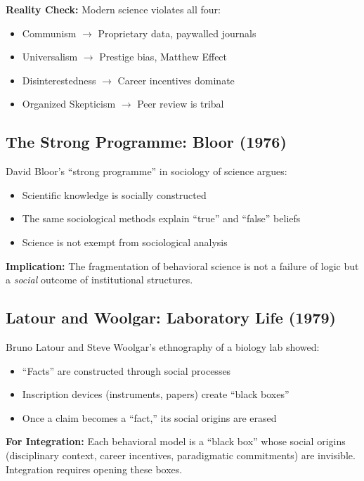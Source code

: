 \textbf{Reality Check:}
Modern science violates all four:
\begin{itemize}
\item Communism $\to$ Proprietary data, paywalled journals
\item Universalism $\to$ Prestige bias, Matthew Effect
\item Disinterestedness $\to$ Career incentives dominate
\item Organized Skepticism $\to$ Peer review is tribal
\end{itemize}

\subsection{The Strong Programme: Bloor (1976)}

David Bloor's ``strong programme'' in sociology of science argues:
\begin{itemize}
\item Scientific knowledge is socially constructed
\item The same sociological methods explain ``true'' and ``false'' beliefs
\item Science is not exempt from sociological analysis
\end{itemize}

\textbf{Implication:}
The fragmentation of behavioral science is not a failure of logic but a \textit{social} outcome of institutional structures.

\subsection{Latour and Woolgar: Laboratory Life (1979)}

Bruno Latour and Steve Woolgar's ethnography of a biology lab showed:
\begin{itemize}
\item ``Facts'' are constructed through social processes
\item Inscription devices (instruments, papers) create ``black boxes''
\item Once a claim becomes a ``fact,'' its social origins are erased
\end{itemize}

\textbf{For Integration:}
Each behavioral model is a ``black box'' whose social origins (disciplinary context, career incentives, paradigmatic commitments) are invisible. Integration requires opening these boxes.


